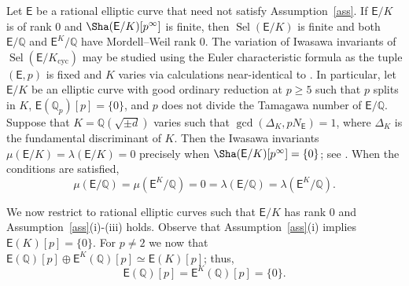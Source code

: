 \documentclass{amsart}
\numberwithin{equation}{section}
\theoremstyle{remark}
\newcommand{\cyc}{\operatorname{cyc}}
\newcommand{\Sel}{\operatorname{Sel}}
\newcommand{\Q}{\mathbb{Q}}
\newcommand{\EC}{\mathsf{E}}
\theoremstyle{plain} %
\begin{document}
Let $\EC$ be a rational elliptic curve that need not satisfy Assumption~\ref{ass}.
If $\EC/K$ is of rank $0$ and $\Sha(\EC/K){[p^\infty]}$ is finite, then $\Sel(\EC/K)$ is finite and both $\EC/\Q$ and $\EC^K/\Q$ have Mordell--Weil rank 0.
The variation of Iwasawa invariants of $\Sel(\EC/K_{\cyc})$ may be studied using the Euler characteristic formula as the tuple $(\EC,p)$ is fixed and $K$ varies via calculations near-identical to \cite[Section~7]{HKR}.
In particular, let $\EC/K$ be an elliptic curve with good ordinary reduction at $p\geq 5$ such that $p$ splits in $K$, $\EC(\Q_p)[p]=\{0\}$, and $p$ does not divide the Tamagawa number of $\EC/\Q$.
Suppose that $K=\Q(\sqrt{\pm d})$ varies such that $\gcd(\Delta_K, pN_{\EC})=1$, where $\Delta_K$ is the fundamental discriminant of $K$.
Then the Iwasawa invariants $\mu(\EC/K)=\lambda(\EC/K)=0$ precisely when $\Sha(\EC/K)[p^\infty]=\{0\}$; see \cite[Conjecture~1.1]{BKLOS21}.
When the conditions are satisfied,
\[
\mu(\EC/\Q)= \mu(\EC^K/\Q) = 0= \lambda(\EC/\Q) = \lambda(\EC^K/\Q).
\]

We now restrict to rational elliptic curves such that $\EC/K$ has rank 0 and Assumption~\ref{ass}(i)-(iii) holds.
Observe that Assumption~\ref{ass}(i) implies $\EC(K)[p] =\{0\}$.
For $p\neq 2$ we now that $\EC(\Q)[p] \oplus \EC^{K}(\Q)[p] \simeq \EC(K)[p]$; thus,
\[
\EC(\Q)[p] = \EC^{K}(\Q)[p] =\{0\}.
\]
\end{document}
